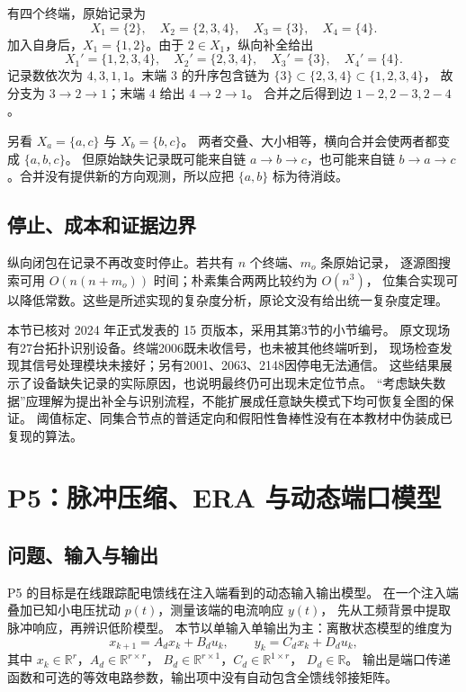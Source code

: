 \begin{example}
有四个终端，原始记录为
\[
 X_1=\{2\},\quad X_2=\{2,3,4\},\quad X_3=\{3\},\quad X_4=\{4\}.
\]
加入自身后，$X_1=\{1,2\}$。由于 $2\in X_1$，纵向补全给出
\[
 X_1'=\{1,2,3,4\},\quad X_2'=\{2,3,4\},\quad
 X_3'=\{3\},\quad X_4'=\{4\}.
\]
记录数依次为 $4,3,1,1$。末端 $3$ 的升序包含链为
$\{3\}\subset\{2,3,4\}\subset\{1,2,3,4\}$，
故分支为 $3\to2\to1$；末端 $4$ 给出 $4\to2\to1$。
合并之后得到边 $1\!-\!2,2\!-\!3,2\!-\!4$。

另看 $X_a=\{a,c\}$ 与 $X_b=\{b,c\}$。
两者交叠、大小相等，横向合并会使两者都变成 $\{a,b,c\}$。
但原始缺失记录既可能来自链 $a\to b\to c$，也可能来自链
$b\to a\to c$。合并没有提供新的方向观测，所以应把 $\{a,b\}$ 标为待消歧。
\end{example}

\subsection{停止、成本和证据边界}
纵向闭包在记录不再改变时停止。若共有 $n$ 个终端、$m_o$ 条原始记录，
逐源图搜索可用 $O(n(n+m_o))$ 时间；朴素集合两两比较约为 $O(n^3)$，
位集合实现可以降低常数。这些是所述实现的复杂度分析，原论文没有给出统一复杂度定理。

本节已核对 2024 年正式发表的 15 页版本，采用其第3节的小节编号。
原文现场有27台拓扑识别设备。终端2006既未收信号，也未被其他终端听到，
现场检查发现其信号处理模块未接好；另有2001、2063、2148因停电无法通信。
这些结果展示了设备缺失记录的实际原因，也说明最终仍可出现未定位节点。
“考虑缺失数据”应理解为提出补全与识别流程，不能扩展成任意缺失模式下均可恢复全图的保证。
阈值标定、同集合节点的普适定向和假阳性鲁棒性没有在本教材中伪装成已复现的算法。

\section{P5：脉冲压缩、ERA 与动态端口模型}\label{sec:tb-P5}

\subsection{问题、输入与输出}
P5 的目标是在线跟踪配电馈线在注入端看到的动态输入输出模型。\citep{P5}
在一个注入端叠加已知小电压扰动 $p(t)$，测量该端的电流响应 $y(t)$，
先从工频背景中提取脉冲响应，再辨识低阶模型。
本节以单输入单输出为主：离散状态模型的维度为
\[
 x_{k+1}=A_dx_k+B_du_k,\qquad y_k=C_dx_k+D_du_k,
\]
其中 $x_k\in\mathbb R^r$，$A_d\in\mathbb R^{r\times r}$，
$B_d\in\mathbb R^{r\times1}$，$C_d\in\mathbb R^{1\times r}$，
$D_d\in\mathbb R$。
输出是端口传递函数和可选的等效电路参数，输出项中没有自动包含全馈线邻接矩阵。

